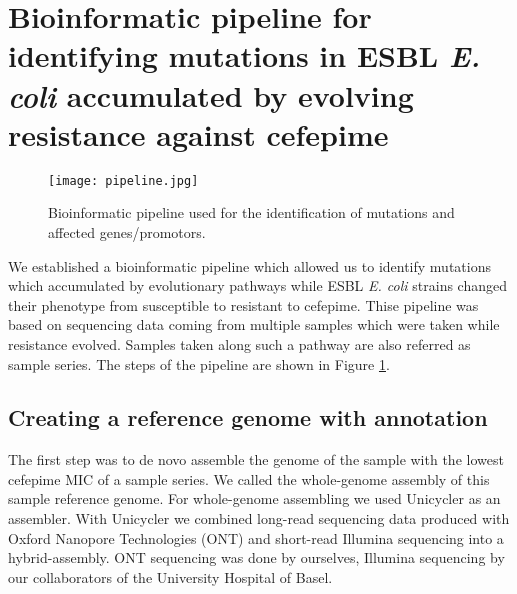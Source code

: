 \section{Bioinformatic pipeline for identifying mutations in ESBL \textit{E. coli} accumulated by evolving resistance against cefepime}
\label{section:pipeline}
\begin{figure}
	\texttt{[image: pipeline.jpg]}
	\caption{Bioinformatic pipeline used for the identification of mutations and affected genes/promotors.}
	\label{figure:pipeline}
\end{figure}
We established a bioinformatic pipeline which allowed us to identify mutations which accumulated by evolutionary pathways while ESBL \textit{E. coli} strains changed their phenotype from susceptible to resistant to cefepime. Thise pipeline was based on sequencing data coming from multiple samples which were taken while resistance evolved. Samples taken along such a pathway are also referred as sample series. The steps of the pipeline are shown in Figure \ref{figure:pipeline}.

\subsection{Creating a reference genome with annotation} 
The first step was to de novo assemble the genome of the sample with the lowest cefepime MIC of a sample series. We called the whole-genome assembly of this sample reference genome. For whole-genome assembling we used Unicycler \cite{wick_unicycler:_2017} as an assembler. With Unicycler \cite{wick_unicycler:_2017} we combined long-read sequencing data produced with Oxford Nanopore Technologies (ONT) and short-read Illumina sequencing into a hybrid-assembly. ONT sequencing was done by ourselves, Illumina sequencing by our collaborators of the University Hospital of Basel.  

